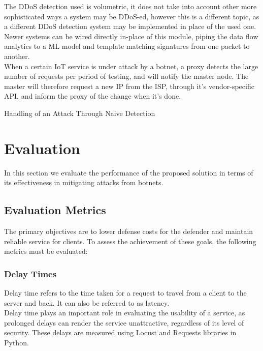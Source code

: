 \documentclass[conference]{IEEEtran}
\begin{document}
The DDoS detection used is volumetric, it does not take into account other more sophisticated ways a system may be DDoS-ed, however this is a different topic, as a different DDoS detection system may be implemented in place of the used one. Newer systems can be wired directly in-place of this module, piping the data flow analytics to a ML model and template matching signatures from one packet to another.\\
When a certain IoT service is under attack by a botnet, a proxy detects the large number of requests per period of testing, and will notify the master node. The master will therefore request a new IP from the ISP, through it's vendor-specific API, and inform the proxy of the change when it's done. 

\begin{algorithm}
\caption{Handling of an Attack Through Naive Detection}
\label{alg:attack-flow}
\SetAlgoLined
{}
\vspace{6pt}
\EndWhile{}
\end{algorithm}


\section{Evaluation}
In this section we evaluate the performance of the proposed solution in terms of its effectiveness in mitigating attacks from botnets. %
\subsection{Evaluation Metrics}
The primary objectives are to lower defense costs for the defender and maintain reliable service for clients. To assess the achievement of these goals, the following metrics must be evaluated:
\subsubsection{Delay Times}
Delay time refers to the time taken for a request to travel from a client to the server and back. It can also be referred to as latency. \\
Delay time plays an important role in evaluating the usability of a service, as prolonged delays can render the service unattractive, regardless of its level of security. These delays are measured using Locust and Requests libraries in Python.
\end{document}
